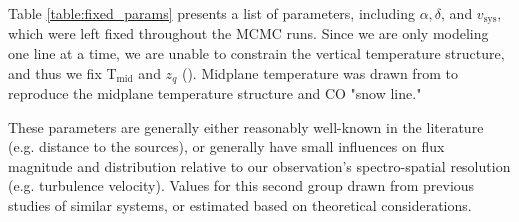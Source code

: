 
Table \ref{table:fixed_params} presents a list of parameters, including $\alpha, \delta$, and $v_\text{sys}$, which were left fixed throughout the MCMC runs. Since we are only modeling one line at a time, we are unable to constrain the vertical temperature structure, and thus we fix T$_\text{mid}$ and $z_q$ (\cite{Factor2017}). Midplane temperature was drawn from \cite{Qi2011} to reproduce the midplane temperature structure and CO "snow line."


These parameters are generally either reasonably well-known in the literature (e.g. distance to the sources), or generally have small influences on flux magnitude and distribution relative to our observation's spectro-spatial resolution (e.g. turbulence velocity). Values for this second group drawn from previous studies of similar systems, or estimated based on theoretical considerations.




